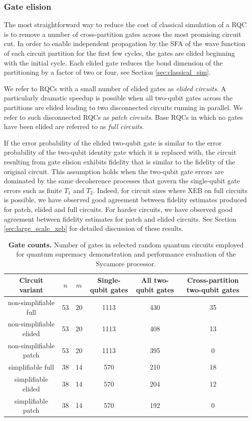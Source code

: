 \subsubsection{Gate elision}
\label{subsubsection:gate_elision}
The most straightforward way to reduce the cost of classical simulation of a RQC is to remove a number of cross-partition gates across the most promising circuit cut. In order to enable independent propagation by the SFA of the wave function of each circuit partition for the first few cycles, the gates are elided beginning with the initial cycle. Each elided gate reduces the bond dimension of the partitioning by a factor of two or four, see Section \ref{sec:classical_sim}.

We refer to RQCs with a small number of elided gates as \textit{elided circuits}. A particularly dramatic speedup is possible when all two-qubit gates across the partitions are elided leading to two disconnected circuits running in parallel. We refer to such disconnected RQCs as \textit{patch circuits}. Base RQCs in which no gates have been elided are referred to as \textit{full circuits}.

If the error probability of the elided two-qubit gate is similar to the error probability of the two-qubit identity gate which it is replaced with, the circuit resulting from gate elision exhibits fidelity that is similar to the fidelity of the original circuit. This assumption holds when the two-qubit gate errors are dominated by the same decoherence processes that govern the single-qubit gate errors such as finite $T_1$ and $T_2$. Indeed, for circuit sizes where XEB on full circuits is possible, we have observed good agreement between fidelity estimates produced for patch, elided and full circuits. For harder circuits, we have observed good agreement between fidelity estimates for patch and elided circuits. See Section \ref{sec:large_scale_xeb} for detailed discussion of these results.

\begin{table}
\centering
\begin{tabular}{|c|c|c|c|c|c|}
\hline 
\textbf{Circuit variant} & \textbf{$n$} & \textbf{$m$} & \textbf{Single-qubit gates} & \textbf{All two-qubit gates} & \textbf{Cross-partition two-qubit gates} \tabularnewline
\hline 
\hline 
non-simplifiable full & 53 & 20 & 1113 & 430 & 35 \tabularnewline
non-simplifiable elided & 53 & 20 & 1113 & 408 & 13 \tabularnewline
non-simplifiable patch & 53 & 20 & 1113 & 395 & 0 \tabularnewline
simplifiable full & 38 & 14 & 570 & 210 & 18 \tabularnewline
simplifiable elided & 38 & 14 & 570 & 204 & 12 \tabularnewline
simplifiable patch & 38 & 14 & 570 & 192 & 0 \tabularnewline
\hline 
\end{tabular}
\caption{\label{table:rqc_params} \textbf{Gate counts.} Number of gates in selected random quantum circuits employed for quantum supremacy demonstration and performance evaluation of the Sycamore processor.} 
\end{table}

